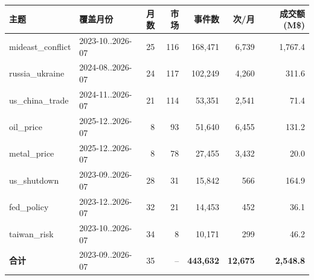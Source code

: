 \setlength{\tabcolsep}{4pt}
\begin{tabular}{llrrrrr}
\toprule
主题 & 覆盖月份 & 月数 & 市场 & 事件数 & 次/月 & 成交额(M\$) \\
\midrule
mideast\_conflict & 2023-10..2026-07 & 25 & 116 & 168,471 & 6,739 & 1,767.4 \\
russia\_ukraine & 2024-08..2026-07 & 24 & 117 & 102,249 & 4,260 & 311.6 \\
us\_china\_trade & 2024-11..2026-07 & 21 & 114 & 53,351 & 2,541 & 71.4 \\
oil\_price & 2025-12..2026-07 & 8 & 93 & 51,640 & 6,455 & 131.2 \\
metal\_price & 2025-12..2026-07 & 8 & 78 & 27,455 & 3,432 & 20.0 \\
us\_shutdown & 2023-09..2026-07 & 28 & 31 & 15,842 & 566 & 164.9 \\
fed\_policy & 2023-12..2026-07 & 32 & 21 & 14,453 & 452 & 36.1 \\
taiwan\_risk & 2023-10..2026-07 & 34 & 8 & 10,171 & 299 & 46.2 \\
\midrule
\textbf{合计} & 2023-09..2026-07 & 35 & -- & \textbf{443,632} & \textbf{12,675} & \textbf{2,548.8} \\
\bottomrule
\end{tabular}
